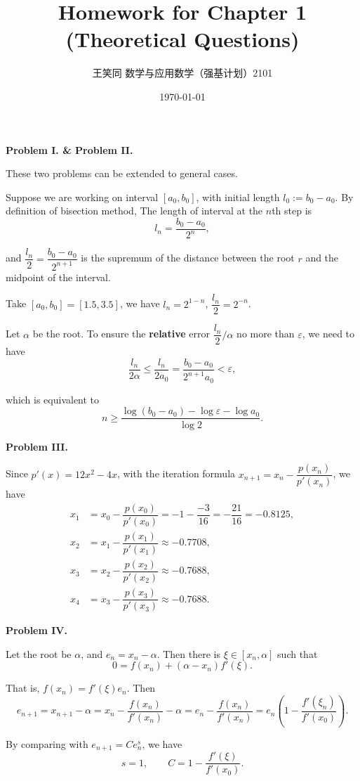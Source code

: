 \documentclass[UTF8]{ctexart}
\title{\vspace{-2cm}Homework for Chapter 1 (Theoretical Questions)}
\author{王笑同 \quad 3210105450 \quad 数学与应用数学（强基计划）2101}
\date{\today}
\begin{document}
\pagestyle{plain}

\maketitle

\textbf{Problem I. \& Problem II. }

These two problems can be extended to general cases. 

Suppose we are working on interval $[a_0,b_0]$, with initial length $l_0:=b_0-a_0$. By definition of bisection method, The length of interval at the $n$th step is
\[l_n=\dfrac{b_0-a_0}{2^n},\]

and $\dfrac{l_n}{2}=\dfrac{b_0-a_0}{2^{n+1}}$ is the supremum of the distance between the root $r$ and the midpoint of the interval.

Take $[a_0,b_0]=[1.5, 3.5]$, we have $l_n=2^{1-n}$, $\dfrac{l_n}{2}=2^{-n}$.

Let $\alpha$ be the root. To ensure the \textbf{relative} error $\dfrac{l_n}{2}\bigg / \alpha$ no more than $\varepsilon$, we need to have
\[\dfrac{l_n}{2\alpha}\leqslant\dfrac{l_n}{2a_0}=\dfrac{b_0-a_0}{2^{n+1}a_0}<\varepsilon,\]

which is equivalent to
\[n\geqslant \dfrac{\log(b_0-a_0)-\log\varepsilon-\log a_0}{\log 2}.\]

\quad

\textbf{Problem III.}

Since $p'(x)=12x^2-4x$, with the iteration formula $x_{n+1}=x_n-\dfrac{p(x_n)}{p'(x_n)}$, we have
\[\begin{aligned}
    x_1&=x_0-\dfrac{p(x_0)}{p'(x_0)}=-1-\dfrac{-3}{16}=-\dfrac{21}{16}=-0.8125,\\
    x_2&=x_1-\dfrac{p(x_1)}{p'(x_1)}\approx -0.7708,\\
    x_3&=x_2-\dfrac{p(x_2)}{p'(x_2)}\approx -0.7688,\\
    x_4&=x_3-\dfrac{p(x_3)}{p'(x_3)}\approx -0.7688.
\end{aligned}\]

\newpage

\textbf{Problem IV.}

Let the root be $\alpha$, and $e_n=x_n-\alpha$. Then there is $\xi\in[x_n,\alpha]$ such that
\[0=f(x_n)+(\alpha-x_n)f'(\xi).\]

That is, $f(x_n)=f'(\xi)e_n$. Then
\[e_{n+1}=x_{n+1}-\alpha=x_n-\dfrac{f(x_n)}{f'(x_n)}-\alpha=e_n-\dfrac{f(x_n)}{f'(x_n)}=e_n\left(1-\dfrac{f'(\xi_n)}{f'(x_0)}\right).\]

By comparing with $e_{n+1}=Ce_n^s$, we have
\[s=1,\qquad C=1-\dfrac{f'(\xi)}{f'(x_0)}.\]
\end{document}
